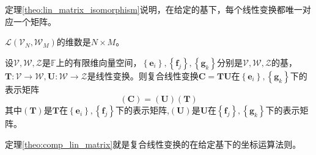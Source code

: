 \documentclass[main.tex]{subfiles}
\begin{document}
定理\ref{theo:lin_matrix_isomorphism}说明，在给定的基下，每个线性变换都唯一对应一个矩阵。

\begin{theorem}
$\mathcal{L}\left(\mathcal{V}_N,\mathcal{W}_M\right)$的维数是$N\times M$。
\end{theorem}

\begin{theorem}
设$\mathcal{V},\mathcal{W},\mathcal{Z}$是$\mathbb{F}$上的有限维向量空间，$\left\{\mathbf{e}_i\right\},\left\{\mathbf{f}_j\right\},\left\{\mathbf{g}_k\right\}$分别是$\mathcal{V},\mathcal{W},\mathcal{Z}$的基，$\mathbf{T}:\mathcal{V}\rightarrow\mathcal{W},\mathbf{U}:\mathcal{W}\rightarrow\mathcal{Z}$是线性变换。则复合线性变换$\mathbf{C}=\mathbf{TU}$在$\left\{\mathbf{e}_i\right\},\left\{\mathbf{g}_k\right\}$下的表示矩阵
\[\left(\mathbf{C}\right)=\left(\mathbf{U}\right)\left(\mathbf{T}\right)\]
其中$\left(\mathbf{T}\right)$是$\mathbf{T}$在$\left\{\mathbf{e}_i\right\},\left\{\mathbf{f}_j\right\}$下的表示矩阵,$\left(\mathbf{U}\right)$是$\mathbf{U}$在$\left\{\mathbf{f}_j\right\},\left\{\mathbf{g}_k\right\}$下的表示矩阵。
\label{theo:comp_lin_matrix}
\end{theorem}

定理\ref{theo:comp_lin_matrix}就是复合线性变换的在给定基下的坐标运算法则。
\end{document}
